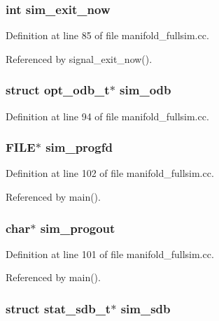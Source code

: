 \subsubsection[{sim\_\-exit\_\-now}]{\setlength{\rightskip}{0pt plus 5cm}int {\bf sim\_\-exit\_\-now}}\label{sim_8h_e6c582e7e1a51970f03ee0c8bb8776df}




Definition at line 85 of file manifold\_\-fullsim.cc.

Referenced by signal\_\-exit\_\-now().
\subsubsection[{sim\_\-odb}]{\setlength{\rightskip}{0pt plus 5cm}struct {\bf opt\_\-odb\_\-t}$\ast$ {\bf sim\_\-odb}}\label{sim_8h_5520d419f4ed203a8f4496330bef06e3}




Definition at line 94 of file manifold\_\-fullsim.cc.
\subsubsection[{sim\_\-progfd}]{\setlength{\rightskip}{0pt plus 5cm}FILE$\ast$ {\bf sim\_\-progfd}}\label{sim_8h_f93f90c77918d1b430318725f0f607a8}




Definition at line 102 of file manifold\_\-fullsim.cc.

Referenced by main().
\subsubsection[{sim\_\-progout}]{\setlength{\rightskip}{0pt plus 5cm}char$\ast$ {\bf sim\_\-progout}}\label{sim_8h_21fe317600267fa77e054df4355779dc}




Definition at line 101 of file manifold\_\-fullsim.cc.

Referenced by main().
\subsubsection[{sim\_\-sdb}]{\setlength{\rightskip}{0pt plus 5cm}struct {\bf stat\_\-sdb\_\-t}$\ast$ {\bf sim\_\-sdb}}\label{sim_8h_2f46df2af0ce568e5ae2ea2a78cb006b}




